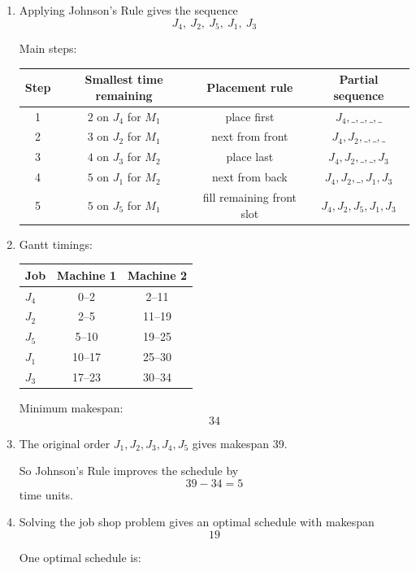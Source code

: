 \documentclass[11pt,a4paper]{article}
\begin{document}
\begin{enumerate}
\item Applying Johnson's Rule gives the sequence
\[
J_4,\ J_2,\ J_5,\ J_1,\ J_3
\]

Main steps:

\begin{center}
\begin{tabular}{cccc}
\toprule
Step & Smallest time remaining & Placement rule & Partial sequence \\
\midrule
1 & $2$ on $J_4$ for $M_1$ & place first & $J_4,\_,\_,\_,\_$ \\
2 & $3$ on $J_2$ for $M_1$ & next from front & $J_4,J_2,\_,\_,\_$ \\
3 & $4$ on $J_3$ for $M_2$ & place last & $J_4,J_2,\_,\_,J_3$ \\
4 & $5$ on $J_1$ for $M_2$ & next from back & $J_4,J_2,\_,J_1,J_3$ \\
5 & $5$ on $J_5$ for $M_1$ & fill remaining front slot & $J_4,J_2,J_5,J_1,J_3$ \\
\bottomrule
\end{tabular}
\end{center}

\item Gantt timings:

\begin{center}
\begin{tabular}{lcc}
\toprule
Job & Machine 1 & Machine 2 \\
\midrule
$J_4$ & 0--2 & 2--11 \\
$J_2$ & 2--5 & 11--19 \\
$J_5$ & 5--10 & 19--25 \\
$J_1$ & 10--17 & 25--30 \\
$J_3$ & 17--23 & 30--34 \\
\bottomrule
\end{tabular}
\end{center}

Minimum makespan:
\[
34
\]

\item The original order $J_1,J_2,J_3,J_4,J_5$ gives makespan 39.

So Johnson's Rule improves the schedule by
\[
39-34=5
\]
time units.

\item Solving the job shop problem gives an optimal schedule with makespan
\[
19
\]

One optimal schedule is:


\end{enumerate}
\end{document}
